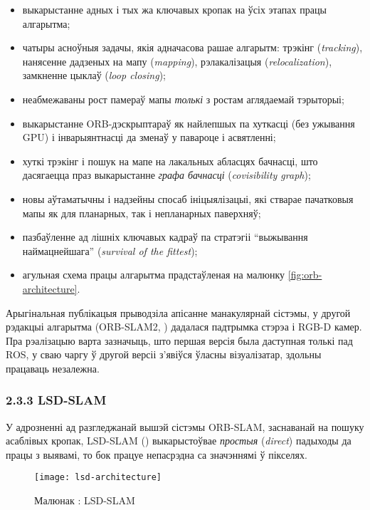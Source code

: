 \begin{itemize}
  \item выкарыстанне адных і тых жа ключавых кропак на ўсіх этапах працы алгарытма;
  \item чатыры асноўныя задачы, якія адначасова рашае алгарытм: трэкінг (\textit{tracking}),
  нанясенне дадзеных на мапу (\textit{mapping}), рэлакалізацыя (\textit{relocalization}),
  замкненне цыклаў (\textit{loop closing});
  \item неабмежаваны рост памераў мапы \textit{толькі} з ростам аглядаемай тэрыторыі;
  \item выкарыстанне ORB-дэскрыптараў як найлепшых па хуткасці (без ужывання GPU)
  і інварыянтнасці да зменаў у павароце і асвятленні;
  \item хуткі трэкінг і пошук на мапе на лакальных абласцях бачнасці, што дасягаецца
  праз выкарыстанне \textit{графа бачнасці} (\textit{covisibility graph});
  \item новы аўтаматычны і надзейны спосаб ініцыялізацыі, які стварае пачатковыя мапы
  як для планарных, так і непланарных паверхняў;
  \item пазбаўленне ад лішніх ключавых кадраў па стратэгіі ``выжывання наймацнейшага''
  (\textit{survival of the fittest});
  \item агульная схема працы алгарытма прадстаўленая на малюнку \ref{fig:orb-architecture}.
\end{itemize}

Арыгінальная публікацыя \cite{murTRO2015} прыводзіла апісанне манакулярнай сістэмы,
у другой рэдакцыі алгарытма (ORB-SLAM2, \cite{murORB2}) дадалася падтрымка стэрэа і RGB-D камер.
Пра рэалізацыю варта зазначыць, што першая версія была даступная толькі пад ROS,
у сваю чаргу ў другой версіі з'явіўся ўласны візуалізатар, здольны працаваць незалежна.

\subsubsection*{2.3.3 LSD-SLAM}

У адрозненні ад разгледжанай вышэй сістэмы ORB-SLAM, заснаванай на пошуку
асаблівых кропак, LSD-SLAM (\cite{engel14eccv}) выкарыстоўвае \textit{простыя} (\textit{direct})
падыходы да працы з выявамі, то бок працуе непасрэдна са значэннямі ў пікселях.

\begin{figure}[H]
  \centering
  \texttt{[image: lsd-architecture]}
  \captionsetup{labelformat=empty}
  \caption{Малюнак : LSD-SLAM}
  \label{fig:lsd-architecture}
\end{figure}

